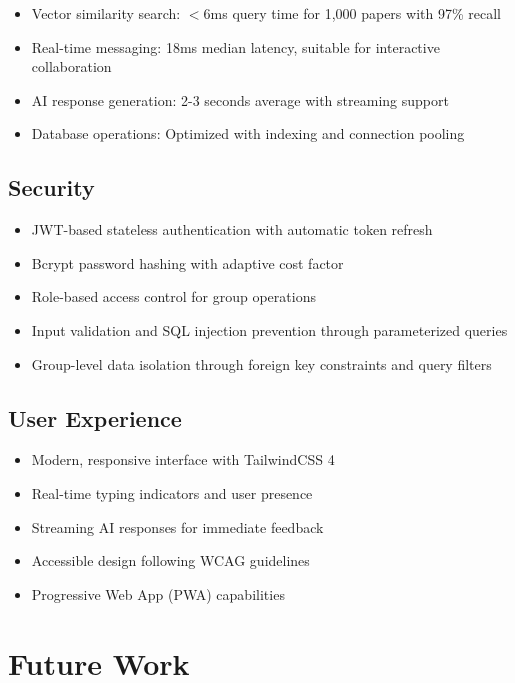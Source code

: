 \documentclass[12pt]{report}
\begin{document}
\begin{itemize}
    \item Vector similarity search: $<$6ms query time for 1,000 papers with 97\% recall
    \item Real-time messaging: 18ms median latency, suitable for interactive collaboration
    \item AI response generation: 2-3 seconds average with streaming support
    \item Database operations: Optimized with indexing and connection pooling
\end{itemize}

\subsection{Security}

\begin{itemize}
    \item JWT-based stateless authentication with automatic token refresh
    \item Bcrypt password hashing with adaptive cost factor
    \item Role-based access control for group operations
    \item Input validation and SQL injection prevention through parameterized queries
    \item Group-level data isolation through foreign key constraints and query filters
\end{itemize}

\subsection{User Experience}

\begin{itemize}
    \item Modern, responsive interface with TailwindCSS 4
    \item Real-time typing indicators and user presence
    \item Streaming AI responses for immediate feedback
    \item Accessible design following WCAG guidelines
    \item Progressive Web App (PWA) capabilities
\end{itemize}

\section{Future Work}
\end{document}
